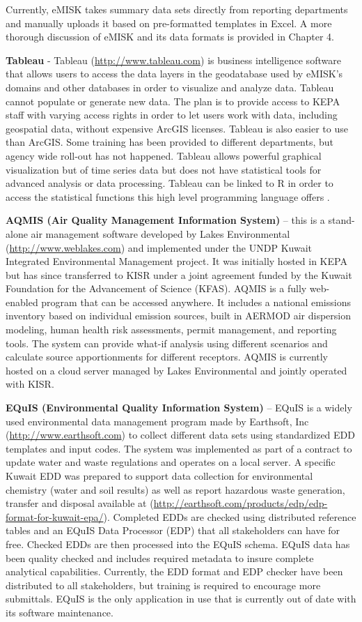 Currently, eMISK takes summary data sets directly from reporting departments and manually uploads it based on pre-formatted templates in Excel. A more thorough discussion of eMISK and its data formats is provided in Chapter 4.

\textbf{Tableau} - Tableau (\url{http://www.tableau.com}) is business intelligence software that allows users to access the data layers in the geodatabase used by eMISK's domains and other databases in order to visualize and analyze data. Tableau cannot populate or generate new data. The plan is to provide access to KEPA staff with varying access rights in order to let users work with data, including geospatial data, without expensive ArcGIS licenses. Tableau is also easier to use than ArcGIS. Some training has been provided to different departments, but agency wide roll-out has not happened. Tableau allows powerful graphical visualization but of time series data but does not have statistical tools for advanced analysis or data processing. Tableau can be linked to R in order to access the statistical functions this high level programming language offers \citep{tableau2018}. 

\textbf{AQMIS (Air Quality Management Information System)} – this is a stand-alone air management software developed by Lakes Environmental (\url{http://www.weblakes.com}) and implemented under the UNDP Kuwait Integrated Environmental Management project. It was initially hosted in KEPA but has since transferred to KISR under a joint agreement funded by the Kuwait Foundation for the Advancement of Science (KFAS). AQMIS is a fully web-enabled program that can be accessed anywhere. It includes a national emissions inventory based on individual emission sources, built in AERMOD air dispersion modeling, human health risk assessments, permit management, and reporting tools. The system can provide what-if analysis using different scenarios and calculate source apportionments for different receptors. AQMIS is currently hosted on a cloud server managed by Lakes Environmental and jointly operated with KISR. 

\textbf{EQuIS (Environmental Quality Information System)} – EQuIS is a widely used environmental data management program made by Earthsoft, Inc (\url{http://www.earthsoft.com}) to collect different data sets using standardized EDD templates and input codes. The system was implemented as part of a contract to update water and waste regulations and operates on a local server. A specific Kuwait EDD was prepared to support data collection for environmental chemistry (water and soil results) as well as report hazardous waste generation, transfer and disposal available at (\url{http://earthsoft.com/products/edp/edp-format-for-kuwait-epa/}). Completed EDDs are checked using distributed reference tables and an EQuIS Data Processor (EDP) that all stakeholders can have for free. Checked EDDs are then processed into the EQuIS schema. EQuIS data has been quality checked and includes required metadata to insure complete analytical capabilities. Currently, the EDD format and EDP checker have been distributed to all stakeholders, but training is required to encourage more submittals. EQuIS is the only application in use that is currently out of date with its software maintenance.

